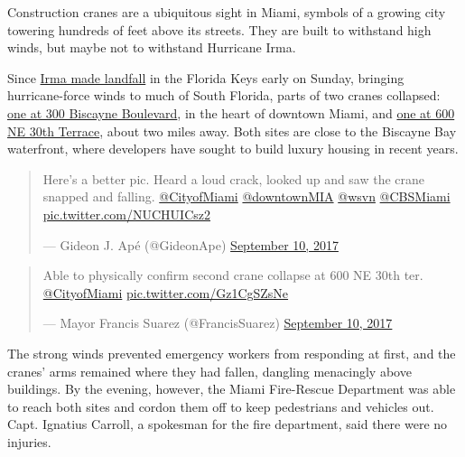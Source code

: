 Construction cranes are a ubiquitous sight in Miami, symbols of a
growing city towering hundreds of feet above its streets. They are built
to withstand high winds, but maybe not to withstand Hurricane Irma.

Since
\href{https://www.nytimes3xbfgragh.onion/2017/09/10/us/hurricane-irma-florida.html}{Irma
made landfall} in the Florida Keys early on Sunday, bringing
hurricane-force winds to much of South Florida, parts of two cranes
collapsed:
\href{https://twitter.com/NWSMiami/status/906889237856997377}{one at 300
Biscayne Boulevard}, in the heart of downtown Miami, and
\href{https://twitter.com/FrancisSuarez/status/906964322580123651}{one
at 600 NE 30th Terrace}, about two miles away. Both sites are close to
the Biscayne Bay waterfront, where developers have sought to build
luxury housing in recent years.

\begin{quote}
Here's a better pic. Heard a loud crack, looked up and saw the crane
snapped and falling.
\href{https://twitter.com/CityofMiami?ref_src=twsrc\%5Etfw}{@CityofMiami}
\href{https://twitter.com/downtownMIA?ref_src=twsrc\%5Etfw}{@downtownMIA}
\href{https://twitter.com/wsvn?ref_src=twsrc\%5Etfw}{@wsvn}
\href{https://twitter.com/CBSMiami?ref_src=twsrc\%5Etfw}{@CBSMiami}
\href{https://t.co/NUCHUICsz2}{pic.twitter.com/NUCHUICsz2}

--- Gideon J. Apé (@GideonApe)
\href{https://twitter.com/GideonApe/status/906885388698038273?ref_src=twsrc\%5Etfw}{September
10, 2017}
\end{quote}

\begin{quote}
Able to physically confirm second crane collapse at 600 NE 30th ter.
\href{https://twitter.com/CityofMiami?ref_src=twsrc\%5Etfw}{@CityofMiami}
\href{https://t.co/Gz1CgSZsNe}{pic.twitter.com/Gz1CgSZsNe}

--- Mayor Francis Suarez (@FrancisSuarez)
\href{https://twitter.com/FrancisSuarez/status/906964322580123651?ref_src=twsrc\%5Etfw}{September
10, 2017}
\end{quote}

The strong winds prevented emergency workers from responding at first,
and the cranes' arms remained where they had fallen, dangling menacingly
above buildings. By the evening, however, the Miami Fire-Rescue
Department was able to reach both sites and cordon them off to keep
pedestrians and vehicles out. Capt. Ignatius Carroll, a spokesman for
the fire department, said there were no injuries.

